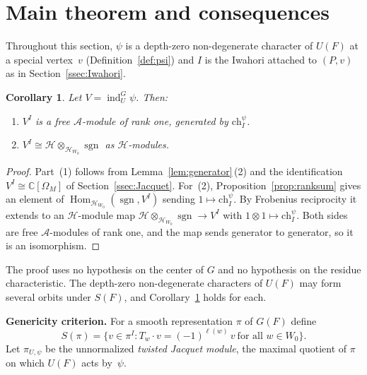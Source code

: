 \documentclass[11pt]{amsart}
\newtheorem{corollary}[theorem]{Corollary}
\theoremstyle{definition}
\theoremstyle{remark}
\DeclareMathOperator{\ind}{ind}
\DeclareMathOperator{\Hom}{Hom}
\DeclareMathOperator{\sgn}{sgn}
\newcommand{\CC}{\mathbb{C}}
\newcommand{\HH}{\mathcal{H}}
\newcommand{\AAA}{\mathcal{A}}
\begin{document}
\section{Main theorem and consequences}\label{sec:main}

Throughout this section, $\psi$ is a depth-zero non-degenerate character of $U(F)$ at a special vertex~$v$ (Definition~\ref{def:psi}) and $I$ is the Iwahori attached to $(P,v)$ as in Section~\ref{ssec:Iwahori}.

\begin{corollary}\label{cor:main}
Let $V = \ind_U^G\psi$. Then:
\begin{enumerate}[\upshape(1)]
\item $V^I$ is a free $\AAA$-module of rank one, generated by $\mathrm{ch}_I^\psi$.
\item $V^I \cong \HH \otimes_{\HH_{W_0}} \sgn$ as $\HH$-modules.
\end{enumerate}
\end{corollary}

\begin{proof}
Part~(1) follows from Lemma~\ref{lem:generator}\,(2) and the identification $V^I \cong \CC[\Omega_M]$ of Section~\ref{ssec:Jacquet}. For~(2), Proposition~\ref{prop:ranksum} gives an element of $\Hom_{\HH_{W_0}}(\sgn, V^I)$ sending $1 \mapsto \mathrm{ch}_I^\psi$. By Frobenius reciprocity it extends to an $\HH$-module map $\HH\otimes_{\HH_{W_0}}\sgn \to V^I$ with $1\otimes 1 \mapsto \mathrm{ch}_I^\psi$. Both sides are free $\AAA$-modules of rank one, and the map sends generator to generator, so it is an isomorphism.
\end{proof}

The proof uses no hypothesis on the center of $G$ and no hypothesis on the residue characteristic. The depth-zero non-degenerate characters of $U(F)$ may form several orbits under $S(F)$, and Corollary~\ref{cor:main} holds for each. 




\medskip
\noindent\textbf{Genericity criterion.} For a smooth representation $\pi$ of $G(F)$ define
\[
S(\pi) = \bigl\{v \in \pi^I : T_w\cdot v = (-1)^{\ell(w)}\,v
\ \text{for all } w \in W_0\bigr\}.
\]
Let $\pi_{U,\psi}$ be the unnormalized \emph{twisted Jacquet module}, the maximal quotient of $\pi$ on which $U(F)$ acts by~$\psi$.
\end{document}
